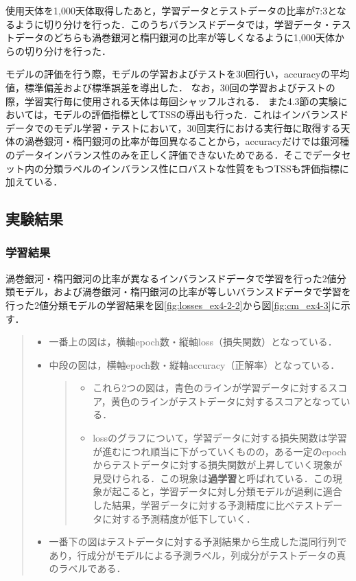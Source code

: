 \documentclass[a4j, 11pt]{jreport}
\begin{document}
使用天体を1,000天体取得したあと，学習データとテストデータの比率が7:3となるように切り分けを行った．このうちバランスドデータでは，学習データ・テストデータのどちらも渦巻銀河と楕円銀河の比率が等しくなるように1,000天体からの切り分けを行った．

モデルの評価を行う際，モデルの学習およびテストを30回行い，accuracyの平均値，標準偏差および標準誤差を導出した．
なお，30回の学習およびテストの際，学習実行毎に使用される天体は毎回シャッフルされる．
また4.3節の実験においては，モデルの評価指標としてTSSの導出も行った．これはインバランスドデータでのモデル学習・テストにおいて，30回実行における実行毎に取得する天体の渦巻銀河・楕円銀河の比率が毎回異なることから，accuracyだけでは銀河種のデータインバランス性のみを正しく評価できないためである．そこでデータセット内の分類ラベルのインバランス性にロバストな性質をもつTSSも評価指標に加えている．

\subsection{実験結果}
\subsubsection{学習結果}
渦巻銀河・楕円銀河の比率が異なるインバランスドデータで学習を行った2値分類モデル，および渦巻銀河・楕円銀河の比率が等しいバランスドデータで学習を行った2値分類モデルの学習結果を図\ref{fig:losses_ex4-2-2}から図\ref{fig:cm_ex4-3}に示す．

\begin{quote}
	\begin{itemize}
	 \item 一番上の図は，横軸epoch数・縦軸loss（損失関数）となっている．
	 \item 中段の図は，横軸epoch数・縦軸accuracy（正解率）となっている．
	 \begin{quote}
		\begin{itemize}
		 \item これら2つの図は，青色のラインが学習データに対するスコア，黄色のラインがテストデータに対するスコアとなっている．
		 \item lossのグラフについて，学習データに対する損失関数は学習が進むにつれ順当に下がっていくものの，ある一定のepochからテストデータに対する損失関数が上昇していく現象が見受けられる．この現象は\textbf{過学習}と呼ばれている．この現象が起こると，学習データに対し分類モデルが過剰に適合した結果，学習データに対する予測精度に比べテストデータに対する予測精度が低下していく．
		\end{itemize}
	 \end{quote}
	 \item 一番下の図はテストデータに対する予測結果から生成した混同行列であり，行成分がモデルによる予測ラベル，列成分がテストデータの真のラベルである．
	\end{itemize}
 \end{quote}
\end{document}
